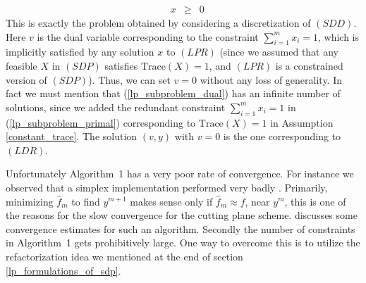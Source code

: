 \documentclass[12pt]{kluwer}
\begin{document}
\begin{article}
\begin{equation}
\begin{array}{lrccc}
& x & \ge & 0
\end{array}
\end{equation}
This is exactly the problem obtained by considering a discretization of $(SDD)$. Here
$v$ is the dual variable corresponding to the constraint $\sum_{i=1}^mx_i=1$,
which is implicitly satisfied by any solution $x$ to $(LPR)$ (since we assumed that any feasible
$X$ in $(SDP)$ satisfies $\mbox{Trace}(X) = 1$, and $(LPR)$ is a constrained version of $(SDP)$).
Thus, we can set $v=0$ without any loss of generality. In fact we must mention that
(\ref{lp_subproblem_dual}) has an infinite number of solutions, since we added the redundant
constraint $\sum_{i=1}^mx_i = 1$ in (\ref{lp_subproblem_primal}) corresponding to
$\mbox{Trace}(X) = 1$ in Assumption \ref{constant_trace}. The solution $(v,y)$ with $v = 0$ is the one corresponding
to $(LDR)$.

Unfortunately Algorithm~1 has a very poor rate of convergence.
For instance we observed
that a simplex implementation performed very badly
\cite{krishnan_mitchell,krishnan}.
Primarily,
minimizing $\hat{f}_m$ to find $y^{m+1}$ makes sense only if $\hat{f}_m \approx f$, near $y^m$, this is one of the
reasons for the slow convergence for the cutting plane scheme.  discusses some
convergence estimates for such an algorithm.
Secondly the number of constraints in Algorithm~1
gets prohibitively large. One way to overcome this is to utilize the refactorization idea we mentioned at the
end of section \ref{lp_formulations_of_sdp}.


\end{article}
\end{document}
